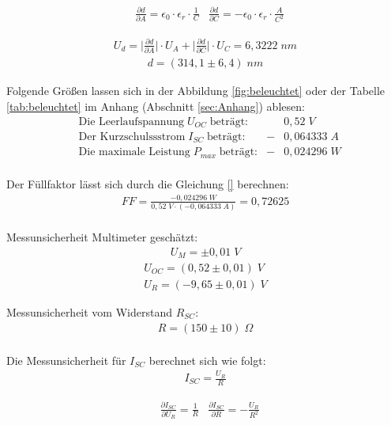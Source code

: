 \documentclass[a4paper]{scrartcl}
\numberwithin{equation}{subsection}
\begin{document}
\begin{align}
&\frac{\partial d}{\partial A} = \epsilon_0 \cdot \epsilon_r \cdot \frac{1}{C}
&\frac{\partial d}{\partial C} = - \epsilon_0 \cdot \epsilon_r \cdot \frac{A}{C^2}
\end{align}

\begin{align*}
U_d = \bigg | \frac{\partial d}{\partial A} \bigg | \cdot U_A + \bigg | \frac{\partial d}{\partial C} 
\bigg | \cdot U_C = 6,3222 \; nm
\end{align*}
\begin{align*}
d = (314,1 \pm 6,4)\; nm
\end{align*}

Folgende Größen lassen sich in der Abbildung \ref{fig:beleuchtet} oder der Tabelle \ref{tab:beleuchtet} im 
Anhang (Abschnitt \ref{sec:Anhang}) ablesen:
\begin{align*}
&\text{Die Leerlaufspannung}\; U_{OC} \; \text{beträgt:} &&0,52\;V \\
&\text{Der Kurzschulssstrom}\; I_{SC} \; \text{beträgt:} &-&0,064333\;A \\
&\text{Die maximale Leistung}\; P_{max} \; \text{beträgt:} &-&0,024296\;W\\
\end{align*}

Der Füllfaktor lässt sich durch die Gleichung \ref{} berechnen:
\begin{align*}
FF = \frac{-0,024296\;W}{0,52\;V \cdot (-0,064333\;A)} = 0,72625
\end{align*}
\\
Messunsicherheit Multimeter geschätzt:
\begin{align*}
U_M = \pm 0,01\;V
\end{align*}
\begin{align*}
U_{OC} = (0,52 \pm 0,01)\;V \\
U_R = (-9,65 \pm 0,01)\;V
\end{align*}

Messunsicherheit vom Widerstand $R_{SC}$:
\begin{align*}
R = (150 \pm 10)\; \Omega \\
\end{align*}

Die Messunsicherheit für $I_{SC}$ berechnet sich wie folgt:
\begin{align*}
I_{SC} = \frac{U_R}{R}
\end{align*}

\begin{align}
&\frac{\partial I_{SC}}{\partial U_R} = \frac{1}{R}
&\frac{\partial I_{SC}}{\partial R} = - \frac{U_R}{R^2}
\end{align}
\end{document}
